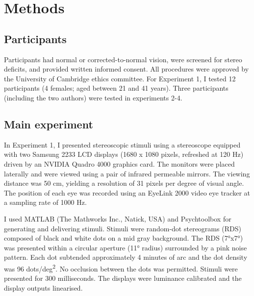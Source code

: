 \section{Methods}
\subsection{Participants}
Participants had normal or corrected-to-normal vision, were screened for stereo deficits, and provided written informed consent. All procedures were approved by the University of Cambridge ethics committee. For Experiment 1, I tested 12 participants (4 females; aged between 21 and 41 years). Three participants (including the two authors) were tested in experiments 2-4.

\subsection{Main experiment}
In Experiment 1, I presented stereoscopic stimuli using a stereoscope equipped with two Samsung 2233 LCD displays (1680 x 1080 pixels, refreshed at 120 Hz) driven by an NVIDIA Quadro 4000 graphics card. The monitors were placed laterally and were viewed using a pair of infrared permeable mirrors. The viewing distance was 50 cm, yielding a resolution of 31 pixels per degree of visual angle. The position of each eye was recorded using an EyeLink 2000 video eye tracker at a sampling rate of 1000 Hz.

I used MATLAB (The Mathworks Inc., Natick, USA) and Psychtoolbox \cite{Brainard:1997aa,Pelli:1997aa,kleiner2007s} for generating and delivering stimuli. Stimuli were random-dot stereograms (RDS) composed of black and white dots on a mid gray background. The RDS (\ang{7}x\ang{7}) was presented within a circular aperture (\ang{11} radius) surrounded by a pink noise pattern. Each dot subtended approximately 4 minutes of arc and the dot density was 96 dots/deg\textsuperscript{2}. No occlusion between the dots was permitted. Stimuli were presented for 300 milliseconds. The displays were luminance calibrated and the display outputs linearised.

